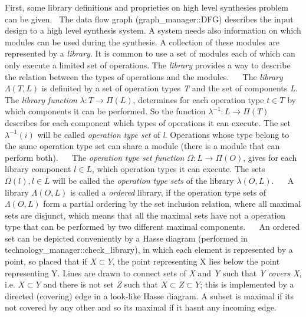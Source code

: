 First, some library definitions and proprieties on high level synthesies problem can be given.~\newline
 The data flow graph (graph\+\_\+manager\+::\+D\+FG) describes the input design to a high level synthesis system. A system needs also information on which modules can be used during the synthesis. A collection of these modules are represented by a {\itshape library}. It is common to use a set of modules each of which can only execute a limited set of operations. The {\itshape library} provides a way to describe the relation between the types of operations and the modules.~\newline
~\newline
 The {\itshape library} $ \Lambda (T,L) $ is definited by a set of operation types {\itshape T} and the set of components {\itshape L}. The {\itshape library} {\itshape function} $ \lambda : T \rightarrow \Pi (L) $, determines for each operation type $ t \in T $ by which components it can be performed. So the function $ \lambda ^ {-1}: L \rightarrow \Pi (T) $ describes for each component which types of operations it can execute. The set $ \lambda ^ {-1}(i) $ will be called {\itshape operation} {\itshape type} {\itshape set} of {\itshape l}. Operations whose type belong to the same operation type set can share a module (there is a module that can perform both).~\newline
~\newline
 The {\itshape operation} {\itshape type} {\itshape set} {\itshape function} $ \Omega : L \rightarrow \Pi (O) $, gives for each library component $ l \in L$, which operation types it can execute. The sets $ \Omega (l),l \in L $ will be called the {\itshape operation} {\itshape type} {\itshape sets} of the library $ \lambda (O,L) $.~\newline
~\newline
 A library $ \Lambda (O,L) $ is called a {\itshape ordered} library, if the operation type sets of $ \Lambda (O,L) $ form a partial ordering by the set inclusion relation, where all maximal sets are disjunct, which means that all the maximal sets have not a operation type that can be performed by two different maximal components.~\newline
~\newline
 An ordered set can be depicted conveniently by a Hasse diagram (performed in technology\+\_\+manager\+::check\+\_\+library), in which each element is represented by a point, so placed that if $ X \subset Y $, the point representing X lies below the point representing Y. Lines are drawn to connect sets of {\itshape X} and {\itshape Y} such that {\itshape Y} {\itshape covers} {\itshape X}, i.\+e. $ X \subset Y $ and there is not set {\itshape Z} such that $ X \subset Z \subset Y $; this is implemented by a directed (covering) edge in a look-\/like Hasse diagram. A subset is maximal if it\textquotesingle{}s not covered by any other and so it\textquotesingle{}s maximal if it hasn\textquotesingle{}t any incoming edge.~\newline
